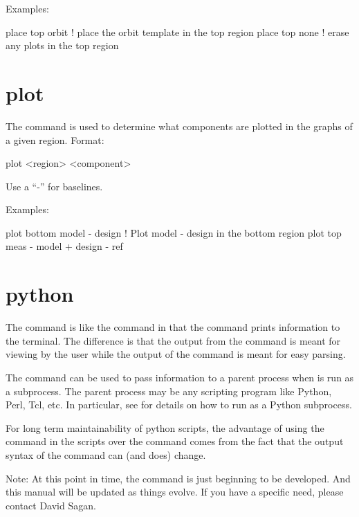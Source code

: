 Examples:
\begin{example}
  place top orbit  ! place the orbit template in the top region
  place top none   ! erase any plots in the top region
\end{example}

\section{plot}
\label{s:plot}

The  command is used to determine what components are plotted
in the graphs of a given region. Format:
\begin{example}
  plot <region> <component>
\end{example}

\vskip 0.2in 

Use a ``-'' for baselines. 

Examples:
\begin{example}
  plot bottom model - design       ! Plot model - design in the bottom region
  plot top meas - model + design - ref 
\end{example}

\section{python}
\label{s:python}

The  command is like the  command in that the
 command prints information to the terminal.  The
difference is that the output from the  command is meant for
viewing by the user while the output of the  command is
meant for easy parsing.

The  command can be used to pass information to a parent
process when \tao is run as a subprocess.
The parent process may be any scripting program like Python, Perl,
Tcl, etc.  In particular, see  for details on how to
run \tao as a Python subprocess.

For long term maintainability of python scripts, the advantage of
using the  command in the scripts over the 
command comes from the fact that the output syntax of the 
 command can (and does) change. 

Note: At this point in time, the  command is just beginning
to be developed. And this manual will be updated as things evolve. If
you have a specific need, please contact David Sagan.

